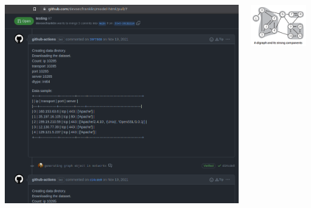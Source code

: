 \documentclass[aspectratio=169]{beamer} %
\begin{document}
\begin{frame}{}
    \begin{columns}
    \begin{column}{0.5\textwidth}
        \begin{center}
            \includegraphics[width=1.0\linewidth,height=0.7\textheight]{../images/kaggle-cml.png}
        \end{center}
    \end{column}
    \begin{column}{0.5\textwidth}
        \begin{center}
            \includegraphics[width=1.0\linewidth,height=0.7\textheight]{../images/strong-components.png}
        \end{center}
    \end{column}
\end{columns}

\end{frame}
\end{document}
